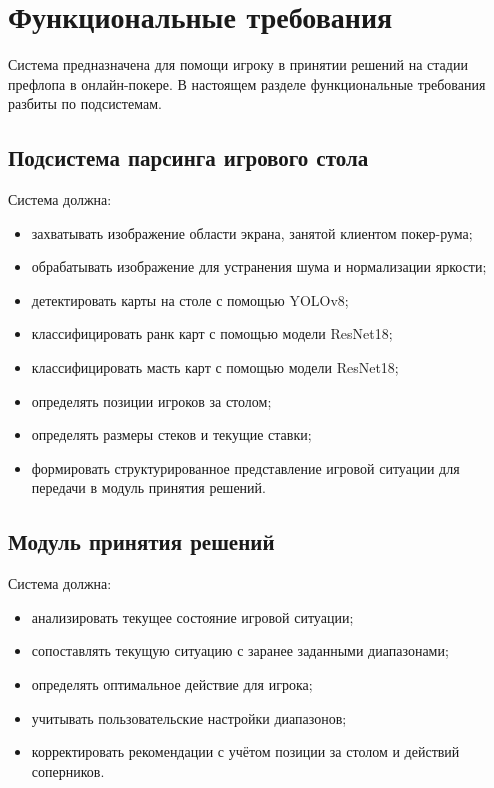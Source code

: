 \section{Функциональные требования}
\label{sec:functional_requirements}

Система предназначена для помощи игроку в принятии решений на стадии префлопа в онлайн-покере. В настоящем разделе функциональные требования разбиты по подсистемам.

\subsection{Подсистема парсинга игрового стола}

Система должна: 

\begin{itemize}
    \item захватывать изображение области экрана, занятой клиентом покер-рума;
    \item обрабатывать изображение для устранения шума и нормализации яркости;
    \item детектировать карты на столе с помощью YOLOv8;
    \item классифицировать ранк карт с помощью модели ResNet18;
    \item классифицировать масть карт с помощью модели ResNet18;
    \item определять позиции игроков за столом;
    \item определять размеры стеков и текущие ставки;
    \item формировать структурированное представление игровой ситуации для передачи в модуль принятия решений.
\end{itemize}

\subsection{Модуль принятия решений}

Система должна: 

\begin{itemize}
    \item анализировать текущее состояние игровой ситуации;
    \item сопоставлять текущую ситуацию с заранее заданными диапазонами;
    \item определять оптимальное действие для игрока;
    \item учитывать пользовательские настройки диапазонов;
    \item корректировать рекомендации с учётом позиции за столом и действий соперников.
\end{itemize}

